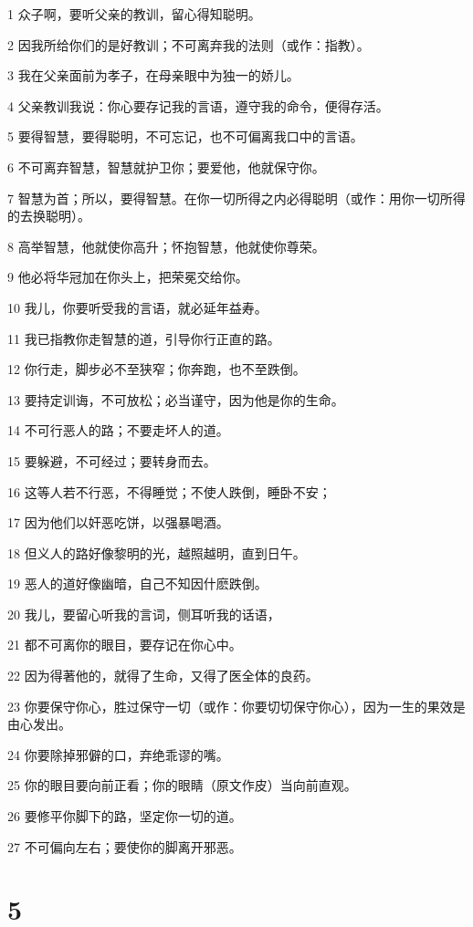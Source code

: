 \par 1 众子啊，要听父亲的教训，留心得知聪明。
\par 2 因我所给你们的是好教训；不可离弃我的法则（或作：指教）。
\par 3 我在父亲面前为孝子，在母亲眼中为独一的娇儿。
\par 4 父亲教训我说：你心要存记我的言语，遵守我的命令，便得存活。
\par 5 要得智慧，要得聪明，不可忘记，也不可偏离我口中的言语。
\par 6 不可离弃智慧，智慧就护卫你；要爱他，他就保守你。
\par 7 智慧为首；所以，要得智慧。在你一切所得之内必得聪明（或作：用你一切所得的去换聪明）。
\par 8 高举智慧，他就使你高升；怀抱智慧，他就使你尊荣。
\par 9 他必将华冠加在你头上，把荣冕交给你。
\par 10 我儿，你要听受我的言语，就必延年益寿。
\par 11 我已指教你走智慧的道，引导你行正直的路。
\par 12 你行走，脚步必不至狭窄；你奔跑，也不至跌倒。
\par 13 要持定训诲，不可放松；必当谨守，因为他是你的生命。
\par 14 不可行恶人的路；不要走坏人的道。
\par 15 要躲避，不可经过；要转身而去。
\par 16 这等人若不行恶，不得睡觉；不使人跌倒，睡卧不安；
\par 17 因为他们以奸恶吃饼，以强暴喝酒。
\par 18 但义人的路好像黎明的光，越照越明，直到日午。
\par 19 恶人的道好像幽暗，自己不知因什麽跌倒。
\par 20 我儿，要留心听我的言词，侧耳听我的话语，
\par 21 都不可离你的眼目，要存记在你心中。
\par 22 因为得著他的，就得了生命，又得了医全体的良药。
\par 23 你要保守你心，胜过保守一切（或作：你要切切保守你心），因为一生的果效是由心发出。
\par 24 你要除掉邪僻的口，弃绝乖谬的嘴。
\par 25 你的眼目要向前正看；你的眼睛（原文作皮）当向前直观。
\par 26 要修平你脚下的路，坚定你一切的道。
\par 27 不可偏向左右；要使你的脚离开邪恶。

\chapter{5}


